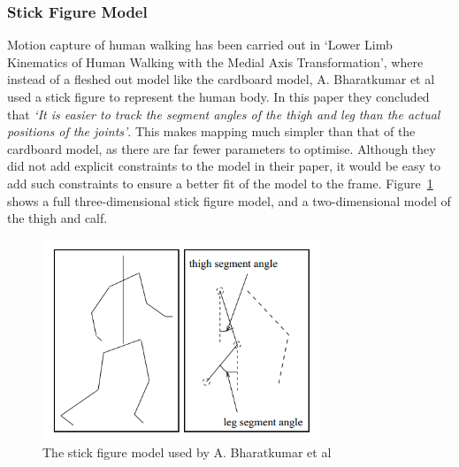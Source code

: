 \subsubsection{Stick Figure Model}

Motion capture of human walking has been carried out in `Lower Limb Kinematics of Human Walking with the Medial Axis Transformation'\cite{stickfigure}, where instead of a fleshed out model like the cardboard model, A. Bharatkumar et al used a stick figure to represent the human body. In this paper they concluded that \emph{`It is easier to track the segment angles of the thigh and leg than the actual positions of the joints'}. This makes mapping much simpler than that of the cardboard model, as there are far fewer parameters to optimise. Although they did not add explicit constraints to the model in their paper, it would be easy to add such constraints to ensure a better fit of the model to the frame. Figure~\ref{fig:stickfiguremodel} shows a full three-dimensional stick figure model, and a two-dimensional model of the thigh and calf.

\begin{figure}[H]
    \centering
    \includegraphics[height=6cm]{background/images/stickfigure}

	\caption{The stick figure model used by A. Bharatkumar et al\cite{stickfigure}}
	\label{fig:stickfiguremodel}
\end{figure}
